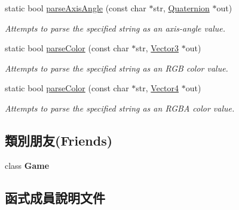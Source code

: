 \begin{DoxyCompactItemize}
static bool \hyperlink{class_i_dream_sky_1_1_key_value_pairs_ab0ec02d5d4f5457f44091e6639ec5fb9}{parse\+Axis\+Angle} (const char $\ast$str, \hyperlink{class_i_dream_sky_1_1_quaternion}{Quaternion} $\ast$out)
\begin{DoxyCompactList}\small\item\em Attempts to parse the specified string as an axis-\/angle value. \end{DoxyCompactList}\item 
static bool \hyperlink{class_i_dream_sky_1_1_key_value_pairs_a0257c22fccc3ea28f85f51319256c37b}{parse\+Color} (const char $\ast$str, \hyperlink{class_i_dream_sky_1_1_vector3}{Vector3} $\ast$out)
\begin{DoxyCompactList}\small\item\em Attempts to parse the specified string as an R\+GB color value. \end{DoxyCompactList}\item 
static bool \hyperlink{class_i_dream_sky_1_1_key_value_pairs_a7ae944254fb5563005dbd6fcf393cfe9}{parse\+Color} (const char $\ast$str, \hyperlink{class_i_dream_sky_1_1_vector4}{Vector4} $\ast$out)
\begin{DoxyCompactList}\small\item\em Attempts to parse the specified string as an R\+G\+BA color value. \end{DoxyCompactList}\end{DoxyCompactItemize}
\subsection*{類別朋友(Friends)}
\begin{DoxyCompactItemize}
\item 
class {\bfseries Game}\hypertarget{class_i_dream_sky_1_1_key_value_pairs_aa2fab026580d6f14280c2ffb8063a314}{}\label{class_i_dream_sky_1_1_key_value_pairs_aa2fab026580d6f14280c2ffb8063a314}

\end{DoxyCompactItemize}


\subsection{函式成員說明文件}
